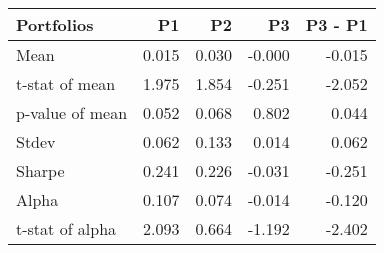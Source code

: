 \begin{tabular}{lrrrr}
\toprule
Portfolios & P1 & P2 & P3 & P3 - P1 \\
\midrule
Mean & 0.015 & 0.030 & -0.000 & -0.015 \\
t-stat of mean & 1.975 & 1.854 & -0.251 & -2.052 \\
p-value of mean & 0.052 & 0.068 & 0.802 & 0.044 \\
Stdev & 0.062 & 0.133 & 0.014 & 0.062 \\
Sharpe & 0.241 & 0.226 & -0.031 & -0.251 \\
Alpha & 0.107 & 0.074 & -0.014 & -0.120 \\
t-stat of alpha & 2.093 & 0.664 & -1.192 & -2.402 \\
\bottomrule
\end{tabular}
